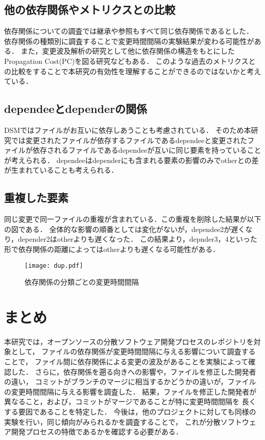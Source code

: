\documentclass{fose2016}           %
\begin{document}
\subsection*{他の依存関係やメトリクスとの比較}
依存関係についての調査では継承や参照もすべて同じ依存関係であるとした．
依存関係の種類\cite{Kotani}別に調査することで変更時間間隔の実験結果が変わる可能性がある．
また，変更波及解析の研究として他に依存関係の構造をもとにしたPropagation Cost(PC)を図る研究などもある\cite{Nord}．
このような過去のメトリクスとの比較をすることで本研究の有効性を理解することができるのではないかと考えている．

\subsection*{dependeeとdependerの関係}
DSM\cite{Nord}ではファイルがお互いに依存しあうことも考慮されている．
そのため本研究では変更されたファイルが依存するファイルであるdependeeと変更されたファイルが依存されるファイルであるdependeeが互いに同じ要素を持っていることが考えられる．
dependeeはdependerにも含まれる要素の影響のみでotherとの差が生まれていることも考えられる．

\subsection*{重複した要素}
同じ変更で同一ファイルの重複が含まれている．この重複を削除した結果が以下の図である．
全体的な影響の順番としては変化がないが，dependee2が遅くなり，depender2はotherよりも遅くなった．
この結果より，depnder3，4といった形で依存関係の距離によってはotherよりも遅くなる可能性がある．
\begin{figure}[t]
\centering
\texttt{[image: dup.pdf]}
\caption{依存関係の分類ごとの変更時間間隔}
\label{fig:subdate} 
\end{figure}



\section{まとめ} \label{まとめ}
本研究では，オープンソースの分散ソフトウェア開発プロセスのレポジトリを対象として，
ファイルの依存関係が変更時間間隔に与える影響について調査することで，
ファイル間に依存関係による変更の波及があることを実験によって確認した．
さらに，依存関係を遡る向きへの影響や，ファイルを修正した開発者の違い，
コミットがブランチのマージに相当するかどうかの違いが，ファイルの変更時間間隔に与える影響を調査した．
結果，ファイルを修正した開発者が異なること，および，コミットがマージであることが特に変更時間間隔を
長くする要因であることを特定した．
今後は，他のプロジェクトに対しても同様の実験を行い，同じ傾向がみられるかを調査することで，
これが分散ソフトウェア開発プロセスの特徴であるかを確認する必要がある．
\end{document}
